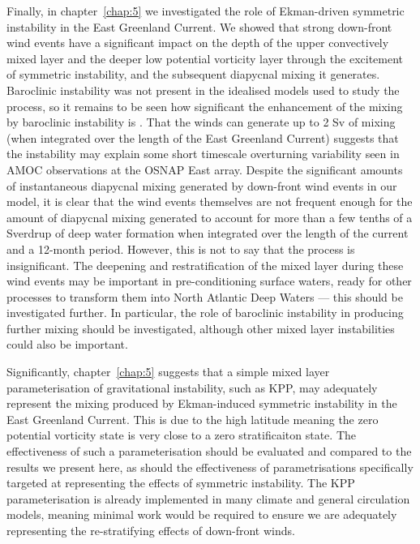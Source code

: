 Finally, in chapter~\ref{chap:5} we investigated the role of Ekman-driven symmetric instability in the East Greenland Current. We showed that strong down-front wind events have a significant impact on the depth of the upper convectively mixed layer and the deeper low potential vorticity layer through the excitement of symmetric instability, and the subsequent diapycnal mixing it generates. Baroclinic instability was not present in the idealised models used to study the process, so it remains to be seen how significant the enhancement of the mixing by baroclinic instability is \citep{Spall2016}. That the winds can generate up to 2 Sv of mixing (when integrated over the length of the East Greenland Current) suggests that the instability may explain some short timescale overturning variability seen in AMOC observations at the OSNAP East array. Despite the significant amounts of instantaneous diapycnal mixing generated by down-front wind events in our model, it is clear that the wind events themselves are not frequent enough for the amount of diapycnal mixing generated to account for more than a few tenths of a Sverdrup of deep water formation when integrated over the length of the current and a 12-month period. However, this is not to say that the process is insignificant. The deepening and restratification of the mixed layer during these wind events may be important in pre-conditioning surface waters, ready for other processes to transform them into North Atlantic Deep Waters --- this should be investigated further. In particular, the role of baroclinic instability in producing further mixing should be investigated, although other mixed layer instabilities could also be important.

Significantly, chapter~\ref{chap:5} suggests that a simple mixed layer parameterisation of gravitational instability, such as KPP, may adequately represent the mixing produced by Ekman-induced symmetric instability in the East Greenland Current.
This is due to the high latitude meaning the zero potential vorticity state is very close to a zero stratificaiton state. The effectiveness of such a parameterisation should be evaluated and compared to the results we present here, as should the effectiveness of parametrisations specifically targeted at representing the effects of symmetric instability.
The KPP parameterisation is already implemented in many climate and general circulation models, meaning minimal work would be required to ensure we are adequately representing the re-stratifying effects of down-front winds.

